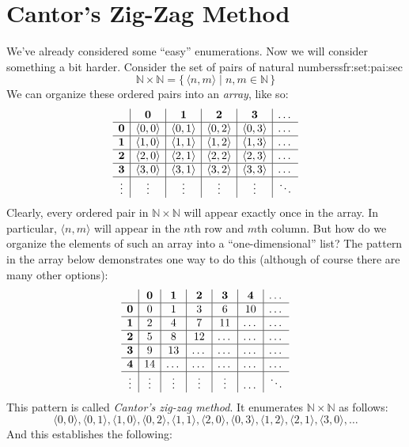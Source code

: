 \documentclass[10pt,a4paper]{article}
\makeatletter
\theoremstyle{plain}
\theoremstyle{definition}
\theoremstyle{remark}
\newenvironment{explain}{}{}
\newcommand*{\olfileid}[3]{}
\newcommand*{\olsection}[1]{\section*{#1}}
\newcommand{\olref}{\@ifnextchar[{\olref@i}{\olref@final}}
\def\olref@i[#1]{\@ifnextchar[{\olref@ii}{\olref@final}}
\def\olref@ii[#1]{\@ifnextchar[{\olref@iii}{\olref@final}}
\def\olref@iii[#1]{\olref@final}
\def\olref@final#1{\ref{#1}}
\providecommand{\tuple}[1]{\langle #1 \rangle}
\providecommand{\Nat}{\ensuremath{\mathbb{N}}}
\providecommand{\Setabs}[2]{\{\, #1 \mid #2 \,\}}
\providecommand{\oliflabeldef}[3]{#1}
\makeatother
\begin{document}
\OLEndChapterHook





\olfileid{sfr}{siz}{zigzag}

\olsection{Cantor's Zig-Zag Method}

\begin{explain}
We've already considered some ``easy'' enumerations. Now we will
consider something a bit harder. Consider the set of pairs of natural
numbers\oliflabeldef{sfr:set:pai:sec}{, which we defined in
\olref[set][pai]{sec} thus:}{defined by:}
\[
\Nat \times \Nat = \Setabs{\tuple{n,m}}{n,m \in \Nat}
\]
We can organize these ordered pairs into an \emph{array}, like so:
\[
\begin{array}{ c | c | c | c | c | c}
& \mathbf 0 & \mathbf 1 & \mathbf 2 & \mathbf 3 & \dots \\
\hline
\mathbf 0 & \tuple{0,0} & \tuple{0,1} & \tuple{0,2} & \tuple{0,3} & \dots \\
\hline
\mathbf 1 & \tuple{1,0} & \tuple{1,1} & \tuple{1,2} & \tuple{1,3} & \dots \\
\hline
\mathbf 2 & \tuple{2,0} & \tuple{2,1} & \tuple{2,2} & \tuple{2,3} & \dots \\
\hline
\mathbf 3 & \tuple{3,0} & \tuple{3,1} & \tuple{3,2} & \tuple{3,3} & \dots \\
\hline
\vdots & \vdots & \vdots & \vdots & \vdots & \ddots\\
\end{array}
\]
Clearly, every ordered pair in $\Nat \times \Nat$ will appear
exactly once in the array. In particular, $\tuple{n,m}$ will appear in
the $n$th row and $m$th column. But how do we organize the elements of
such an array into a ``one-dimensional'' list? The pattern in the array below
demonstrates one way to do this (although of course there are many other options):
\[
\begin{array}{ c | c | c | c | c | c | c}
& \mathbf 0 & \mathbf 1 & \mathbf 2 & \mathbf 3 & \mathbf 4 &\dots \\
\hline
\mathbf 0 & 0  & 1& 3 & 6& 10 &\ldots \\
\hline
\mathbf 1 &2 & 4& 7 & 11 & \dots &\ldots \\
\hline
\mathbf 2 & 5 & 8 & 12 & \ldots & \dots&\ldots \\
\hline
\mathbf 3 & 9 & 13 & \ldots & \ldots & \dots & \ldots \\
\hline
\mathbf 4 & 14 & \ldots & \ldots & \ldots & \dots & \ldots \\
\hline
\vdots & \vdots & \vdots & \vdots & \vdots&\ldots & \ddots\\
\end{array}
\]\noindent
This pattern is called \emph{Cantor's zig-zag method}. It  enumerates
$\Nat \times \Nat$ as follows:
\[
\tuple{0,0}, \tuple{0,1}, \tuple{1,0}, \tuple{0,2}, \tuple{1,1},
\tuple{2,0}, \tuple{0,3}, \tuple{1,2}, \tuple{2,1}, \tuple{3,0}, \dots
\]
And this establishes the following:
\end{explain}
\end{document}
